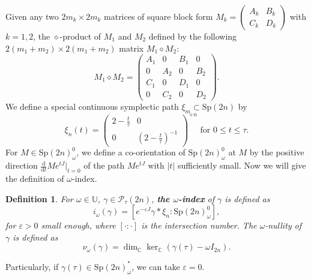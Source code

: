 \documentclass[11pt]{amsart}
\newcommand{\ep}{\varepsilon}
\newtheorem{defi}{Definition}[section]
\begin{document}
Given any two $2m_k\times2m_k$ matrices of square block form $M_k=\begin{pmatrix}
	A_k & B_k\\
	C_k & D_k
\end{pmatrix}$ with $k=1,2$, the $\diamond$-product of $M_1$ and $M_2$ defined by the following $2(m_1+m_2)\times2(m_1+m_2)$ matrix $M_1\diamond M_2$:
$$M_1\diamond M_2=\begin{pmatrix}
	A_1 & 0 & B_1 & 0\\
	0 & A_2 & 0 & B_2\\
	C_1 & 0 & D_1 & 0\\
	0 & C_2 & 0 & D_2
\end{pmatrix}.
$$
We define a special continuous symplectic path $\xi_m\subset\text{Sp}(2n)$ by
$$\xi_n(t)=\begin{pmatrix}
	2-\frac{t}{\tau} & 0\\
	0 & \left(2-\frac{t}{\tau}\right)^{-1}
\end{pmatrix}^{\diamond n} \text{ for }  0\leq t\leq\tau.
$$
For $M\in\text{Sp}(2n)_\omega^0$, we define a co-orientation of $\text{Sp}(2n)_\omega^0$ at $M$ by the positive direction $\frac{\mathrm{d}}{\mathrm{d}t}Me^{tJ}\big|_{t=0}$ of the path $Me^{tJ}$ with $|t|$ sufficiently small. Now we will give the definition of $\omega$-index.
\begin{defi}
	For $\omega\in\mathbb{U}$, $\gamma\in\mathcal{P}_\tau(2n)$, \textbf{the $\omega$-index} of $\gamma$ is defined as
	$$i_\omega(\gamma)=\left[e^{-\ep J}\gamma*\xi_n:\text{Sp}(2n)_\omega^0\right],
	$$
	for $\ep>0$ small enough, where $[\cdot:\cdot]$ is the intersection number. The $\omega$-nullity of $\gamma$ is defined as
	$$\nu_\omega(\gamma)=\dim_\mathbb{C}\ker_\mathbb{C}(\gamma(\tau)-\omega I_{2n}).
	$$
\end{defi}
Particularly, if $\gamma(\tau)\in\text{Sp}(2n)_\omega^*$, we can take $\ep=0$.
\end{document}
